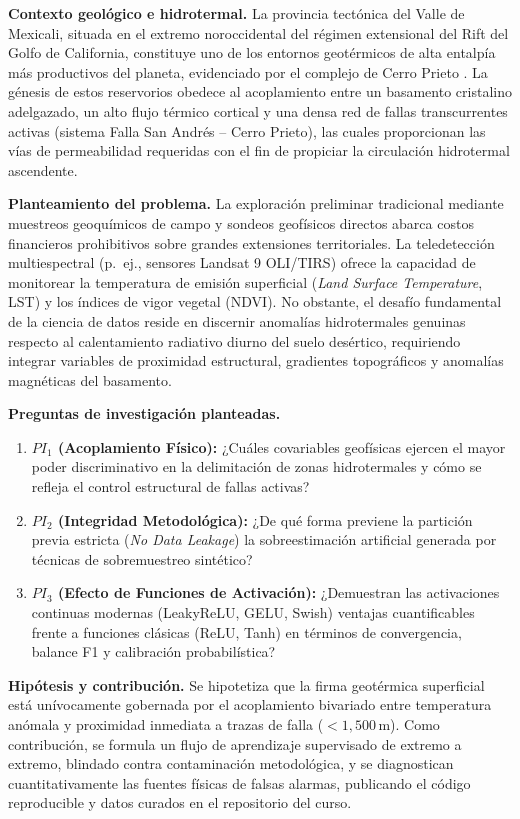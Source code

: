 \documentclass[10pt,twocolumn,letterpaper]{article}
\begin{document}
\textbf{Contexto geológico e hidrotermal.} La provincia tectónica del Valle de Mexicali, situada en el extremo noroccidental del régimen extensional del Rift del Golfo de California, constituye uno de los entornos geotérmicos de alta entalpía más productivos del planeta, evidenciado por el complejo de Cerro Prieto \citep{prolledesma2023}. La génesis de estos reservorios obedece al acoplamiento entre un basamento cristalino adelgazado, un alto flujo térmico cortical y una densa red de fallas transcurrentes activas (sistema Falla San Andrés -- Cerro Prieto), las cuales proporcionan las vías de permeabilidad requeridas con el fin de propiciar la circulación hidrotermal ascendente.

\textbf{Planteamiento del problema.} La exploración preliminar tradicional mediante muestreos geoquímicos de campo y sondeos geofísicos directos abarca costos financieros prohibitivos sobre grandes extensiones territoriales. La teledetección multiespectral (p.~ej., sensores Landsat 9 OLI/TIRS) ofrece la capacidad de monitorear la temperatura de emisión superficial (\emph{Land Surface Temperature}, LST) y los índices de vigor vegetal (NDVI). No obstante, el desafío fundamental de la ciencia de datos reside en discernir anomalías hidrotermales genuinas respecto al calentamiento radiativo diurno del suelo desértico, requiriendo integrar variables de proximidad estructural, gradientes topográficos y anomalías magnéticas del basamento.

\textbf{Preguntas de investigación planteadas.}
\begin{enumerate}[leftmargin=1.2em]
  \item \textbf{$PI_1$ (Acoplamiento Físico):} ¿Cuáles covariables geofísicas ejercen el mayor poder discriminativo en la delimitación de zonas hidrotermales y cómo se refleja el control estructural de fallas activas?
  \item \textbf{$PI_2$ (Integridad Metodológica):} ¿De qué forma previene la partición previa estricta (\emph{No Data Leakage}) la sobreestimación artificial generada por técnicas de sobremuestreo sintético?
  \item \textbf{$PI_3$ (Efecto de Funciones de Activación):} ¿Demuestran las activaciones continuas modernas (LeakyReLU, GELU, Swish) ventajas cuantificables frente a funciones clásicas (ReLU, Tanh) en términos de convergencia, balance F1 y calibración probabilística?
\end{enumerate}

\textbf{Hipótesis y contribución.} Se hipotetiza que la firma geotérmica superficial está unívocamente gobernada por el acoplamiento bivariado entre temperatura anómala y proximidad inmediata a trazas de falla ($<1{,}500$\,m). Como contribución, se formula un flujo de aprendizaje supervisado de extremo a extremo, blindado contra contaminación metodológica, y se diagnostican cuantitativamente las fuentes físicas de falsas alarmas, publicando el código reproducible y datos curados en el repositorio del curso.
\end{document}
